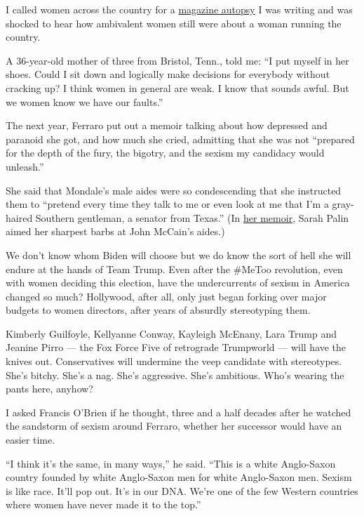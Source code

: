 I called women across the country for a
\href{https://www.nytimes.com/1984/12/30/magazine/reassessing-women-s-political-role-the-lasting-impact-of-geraldine-ferraro.html}{magazine
autopsy} I was writing and was shocked to hear how ambivalent women
still were about a woman running the country.

A 36-year-old mother of three from Bristol, Tenn., told me: ``I put
myself in her shoes. Could I sit down and logically make decisions for
everybody without cracking up? I think women in general are weak. I know
that sounds awful. But we women know we have our faults.''

The next year, Ferraro put out a memoir talking about how depressed and
paranoid she got, and how much she cried, admitting that she was not
``prepared for the depth of the fury, the bigotry, and the sexism my
candidacy would unleash.''

She said that Mondale's male aides were so condescending that she
instructed them to ``pretend every time they talk to me or even look at
me that I'm a gray-haired Southern gentleman, a senator from Texas.''
(In \href{https://www.nytimes.com/2009/11/15/books/15book.html}{her
memoir}, Sarah Palin aimed her sharpest barbs at John McCain's aides.)

We don't know whom Biden will choose but we do know the sort of hell she
will endure at the hands of Team Trump. Even after the \#MeToo
revolution, even with women deciding this election, have the
undercurrents of sexism in America changed so much? Hollywood, after
all, only just began forking over major budgets to women directors,
after years of absurdly stereotyping them.

Kimberly Guilfoyle, Kellyanne Conway, Kayleigh McEnany, Lara Trump and
Jeanine Pirro --- the Fox Force Five of retrograde Trumpworld --- will
have the knives out. Conservatives will undermine the veep candidate
with stereotypes. She's bitchy. She's a nag. She's aggressive. She's
ambitious. Who's wearing the pants here, anyhow?

I asked Francis O'Brien if he thought, three and a half decades after he
watched the sandstorm of sexism around Ferraro, whether her successor
would have an easier time.

``I think it's the same, in many ways,'' he said. ``This is a white
Anglo-Saxon country founded by white Anglo-Saxon men for white
Anglo-Saxon men. Sexism is like race. It'll pop out. It's in our DNA.
We're one of the few Western countries where women have never made it to
the top.''

